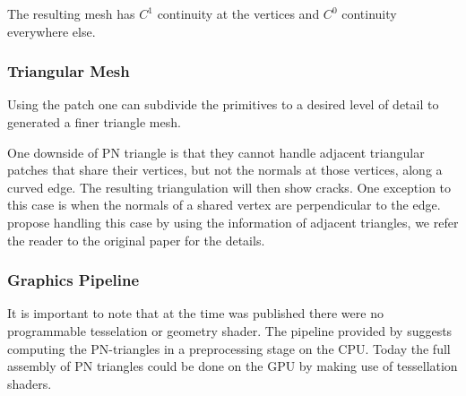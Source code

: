 The resulting mesh has $C^1$ continuity at the vertices and $C^0$ continuity everywhere else. 

\subsubsection*{Triangular Mesh}
Using the patch one can subdivide the primitives to a desired level of detail to generated a finer triangle mesh. 

One downside of PN triangle is that they cannot handle adjacent triangular patches that share their vertices, but not the normals at those vertices, along a curved edge. The resulting triangulation will then show cracks. One exception to this case is when the normals of a shared vertex are perpendicular to the edge. \citeauthor{vlachos2001curved} propose handling this case by using the information of adjacent triangles, we refer the reader to the original paper for the details.

\subsubsection*{Graphics Pipeline}
It is important to note that at the time \textcite{vlachos2001curved} was published there were no programmable tesselation or geometry shader. The pipeline provided by \citeauthor{vlachos2001curved} suggests computing the PN-triangles in a preprocessing stage on the CPU. Today the full assembly of PN triangles could be done on the GPU by making use of tessellation shaders.\\
